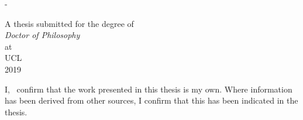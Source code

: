 
\hypersetup{pageanchor=false}
\frontmatter

\begin{titlingpage}
\SingleSpacing
\calccentering{\unitlength}
\begin{adjustwidth*}{\unitlength}{-\unitlength}
\centering
\vspace*{6cm}
{\LARGE \bfseries \thesisTitle}
\vfill
{\Large \thesisAuthor\\[2cm]}

{\large A thesis submitted for the degree of\\[0.5cm]

\textit{Doctor of Philosophy}\\[0.5cm]
at\\[0.5cm]
UCL\\[3cm]
2019}
\end{adjustwidth*}
\end{titlingpage} 
%

\hypersetup{pageanchor=true}
\pagestyle{plain}

\vspace*{3cm}
I, \thesisAuthor~confirm that the work presented in this thesis is my own. Where information has been derived from other sources, I confirm that this has been indicated in the thesis.

\cleardoublepage

%
%

